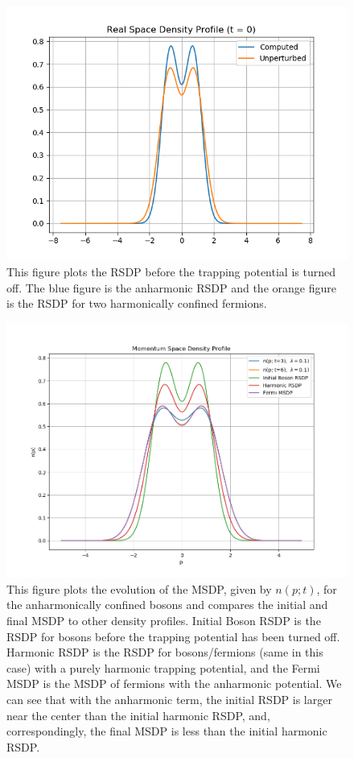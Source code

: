 \documentclass[onecolumn,english,aps,pra]{revtex4}
\begin{document}
\begin{figure}[H]
\center
\includegraphics[scale=0.8]{../Plots/Anharmonic/InitRSDP}
\caption{This figure plots the RSDP before the trapping potential is turned off. The blue figure is the anharmonic RSDP and the orange figure is the RSDP for two harmonically confined fermions.}
\label{fig:InitRSDP}
\end{figure}


\begin{figure}[H]
\center
\includegraphics[scale=0.7]{../Plots/Anharmonic/MSDP-DF}
\caption{This figure plots the evolution of the MSDP, given by $n(p;t)$, for the anharmonically confined bosons and compares the initial and final MSDP to other density profiles. Initial Boson RSDP is the RSDP for bosons before the trapping potential has been turned off. Harmonic RSDP is the RSDP for bosons/fermions (same in this case) with a purely harmonic trapping potential, and the Fermi MSDP is the MSDP of fermions with the anharmonic potential. We can see that with the anharmonic term, the initial RSDP is larger near the center than the initial harmonic RSDP, and, correspondingly, the final MSDP is less than the initial harmonic RSDP.}
\label{fig:DF}
\end{figure}
\end{document}
